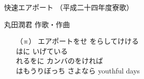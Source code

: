 \documentclass[10pt,b5j]{tarticle} %
\begin{document}
\begin{minipage}[c]{0.7\hsize} %
    \begin{center}
        {\LARGE
            快速エアポート %
        }
        {\small 
            （平成二十四年度寮歌） %
        }
    \end{center}
\end{minipage}
\begin{minipage}[c]{0.3\hsize} %
    \begin{flushright} %
        丸田潤君 作歌・作曲 %
    \end{flushright}
\end{minipage}

\vspace{1.5em} %
\newcommand{\linespace}{0.5em} %
\newcommand{\blocksize}{0.5\hsize} %
\begin{itemize}
    \item[（※）]
    エアポートをせ
    をらしてけける\\
    はに
    いげている\\
    れるをに
    カンバのをければ\\
    はもうりぼっち
    さよなら youthful days
\end{itemize}
\end{document}
